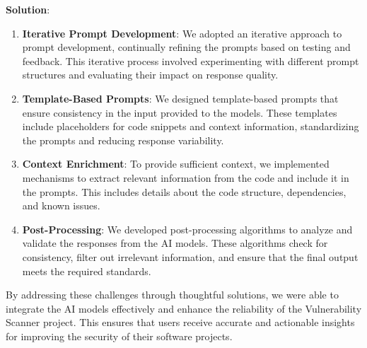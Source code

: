 \textbf{Solution}:

\begin{enumerate}
\item \textbf{Iterative Prompt Development}: We adopted an iterative approach to prompt development, continually refining the prompts based on testing and feedback. 
This iterative process involved experimenting with different prompt structures and evaluating their impact on response quality.
\item \textbf{Template-Based Prompts}: We designed template-based prompts that ensure consistency in the input provided to the models. These templates include placeholders for code snippets and context information, standardizing the prompts and reducing response variability.
\item \textbf{Context Enrichment}: To provide sufficient context, we implemented mechanisms to extract relevant information from the code and include it in the prompts. This includes details about the code structure, dependencies, and known issues.
\item \textbf{Post-Processing}: We developed post-processing algorithms to analyze and validate the responses from the AI models. These algorithms check for consistency, filter out irrelevant information, and ensure that the final output meets the required standards.
\end{enumerate}

By addressing these challenges through thoughtful solutions, we were able to integrate the AI models effectively and enhance the reliability of the Vulnerability Scanner project. 
This ensures that users receive accurate and actionable insights for improving the security of their software projects.
